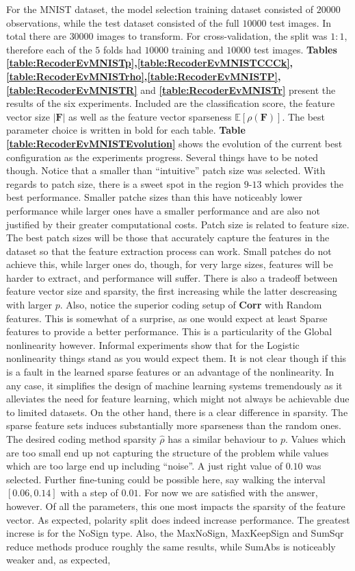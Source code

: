 \documentclass[12pt,a4paper,oneside,english]{UPBThesis}
\begin{document}
For the MNIST dataset, the model selection training dataset consisted of $20000$ observations, while the test dataset consisted of the full $10000$ test images. In total there are $30000$ images to transform. For cross-validation, the split was $1:1$, therefore each of the $5$ folds had $10000$ training and $10000$ test images. \textbf{Tables \ref{table:RecoderEvMNISTp},\ref{table:RecoderEvMNISTCCCk},\ref{table:RecoderEvMNISTrho},\ref{table:RecoderEvMNISTP},\ref{table:RecoderEvMNISTR}} and \textbf{\ref{table:RecoderEvMNISTr}} present the results of the six experiments. Included are the classification score, the feature vector size $\left| \textbf{F} \right|$ as well as the feature vector sparseness $\mathbb{E}[\rho(\textbf{F})]$. The best parameter choice is written in bold for each table. \textbf{Table \ref{table:RecoderEvMNISTEvolution}} shows the evolution of the current best configuration as the experiments progress. Several things have to be noted though. Notice that a smaller than ``intuitive'' patch size was selected. With regards to patch size, there is a sweet spot in the region $9$-$13$ which provides the best performance. Smaller patche sizes than this have noticeably lower performance while larger ones have a smaller performance and are also not justified by their greater computational costs. Patch size is related to feature size. The best patch sizes will be those that accurately capture the features in the dataset so that the feature extraction process can work. Small patches do not achieve this, while larger ones do, though, for very large sizes, features will be harder to extract, and performance will suffer. There is also a tradeoff between feature vector size and sparsity, the first increasing while the latter descreasing with larger $p$. Also, notice the superior coding setup of \textbf{Corr} with Random features. This is somewhat of a surprise, as one would expect at least Sparse features to provide a better performance. This is a particularity of the Global nonlinearity however. Informal experiments show that for the Logistic nonlinearity things stand as you would expect them. It is not clear though if this is a fault in the learned sparse features or an advantage of the nonlinearity. In any case, it simplifies the design of machine learning systems tremendously as it alleviates the need for feature learning, which might not always be achievable due to limited datasets. On the other hand, there is a clear difference in sparsity. The sparse feature sets induces substantially more sparseness than the random ones. The desired coding method sparsity $\hat{\rho}$ has a similar behaviour to $p$. Values which are too small end up not capturing the structure of the problem while values which are too large end up including ``noise''. A just right value of $0.10$ was selected. Further fine-tuning could be possible here, say walking the interval $[0.06,0.14]$ with a step of $0.01$. For now we are satisfied with the answer, however. Of all the parameters, this one most impacts the sparsity of the feature vector. As expected, polarity split does indeed increase performance. The greatest increse is for the NoSign type. Also, the MaxNoSign, MaxKeepSign and SumSqr reduce methods produce roughly the same results, while SumAbs is noticeably weaker and, as expected, 
\end{document}
